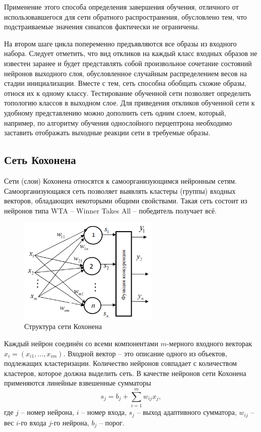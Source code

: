 \documentclass[bachelor, och, referat]{SCWorks}
\begin{document}
Применение этого способа определения завершения обучения, отличного от
использовавшегося для сети обратного распространения, обусловлено тем, что подстраиваемые
значения синапсов фактически не ограничены. 

На втором шаге цикла попеременно предъявляются все образы из входного набора.
Следует отметить, что вид откликов на каждый класс входных образов не известен
заранее и будет представлять собой произвольное сочетание состояний нейронов выходного
слоя, обусловленное случайным распределением весов на стадии инициализации. Вместе с тем,
сеть способна обобщать схожие образы, относя их к одному классу. Тестирование обученной
сети позволяет определить топологию классов в выходном слое. Для приведения откликов
обученной сети к удобному представлению можно дополнить сеть одним слоем, который,
например, по алгоритму обучения однослойного перцептрона необходимо заставить отображать
выходные реакции сети в требуемые образы.

\subsection{Сеть Кохонена}
Сети (слои) Кохонена относятся к самоорганизующимся нейронным сетям. 
Самоорганизующаяся сеть позволяет выявлять кластеры (группы) входных векторов, обладающих
некоторыми общими свойствами. Такая сеть состоит из нейронов типа WTA --
Winner Takes All -- победитель получает всё.

\begin{figure}[H]
    \centering
    \includegraphics[width=0.6\textwidth]{6.png}
    \caption{Структура сети Кохонена}
\end{figure}

Каждый нейрон соединён со всеми компонентами $m$-мерного входного
векторак $x_i = (x_{i1}, \dots, x_{im})$.
Входной вектор -- это описание одного из
объектов, подлежащих кластеризации. Количество нейронов совпадает с
количеством кластеров, которое должна выделить сеть. В качестве нейронов
сети Кохонена применяются линейные взвешенные сумматоры 
\[ s_j = b_j + \sum_{i = 1}^{m} w_{ij} x_j, \]
где $j$ -- номер нейрона, $i$ -- номер входа, $s_j$ -- выход адаптивного сумматора,
$w_{ij}$ -- вес $i$-го входа $j$-го нейрона, $b_j$ -- порог.
\end{document}
